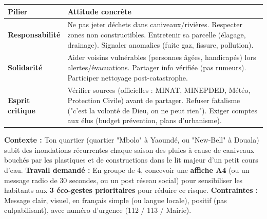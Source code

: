 \documentclass[11pt]{article}
\begin{document}
\begin{aretenir}
\begin{center}
\begin{tabularx}{\linewidth}{|l|X|}\hline
\textbf{Pilier} & \textbf{Attitude concrète} \\ \hline
\textbf{Responsabilité} & Ne pas jeter déchets dans caniveaux/rivières. Respecter zones non constructibles. Entretenir sa parcelle (élagage, drainage). Signaler anomalies (fuite gaz, fissure, pollution). \\ \hline
\textbf{Solidarité} & Aider voisins vulnérables (personnes âgées, handicapés) lors alertes/évacuations. Partager info vérifiée (pas rumeurs). Participer nettoyage post-catastrophe. \\ \hline
\textbf{Esprit critique} & Vérifier sources (officielles : MINAT, MINEPDED, Météo, Protection Civile) avant de partager. Refuser fatalisme ("c'est la volonté de Dieu, on ne peut rien"). Exiger comptes aux élus (budget prévention, plans d'urbanisme). \\ \hline
\end{tabularx}
\end{center}
\end{aretenir}

\begin{exercice}
\textbf{Contexte :} Ton quartier (quartier "Mbolo" à Yaoundé, ou "New-Bell" à Douala) subit des inondations récurrentes chaque saison des pluies à cause de caniveaux bouchés par les plastiques et de constructions dans le lit majeur d'un petit cours d'eau.
\textbf{Travail demandé :} En groupe de 4, concevoir une \textbf{affiche A4} (ou un message radio de 30 secondes, ou un post réseau social) pour sensibiliser les habitants aux \textbf{3 éco-gestes prioritaires} pour réduire ce risque.
\textbf{Contraintes :} Message clair, visuel, en français simple (ou langue locale), positif (pas culpabilisant), avec numéro d'urgence (112 / 113 / Mairie).
\end{exercice}
\end{document}
